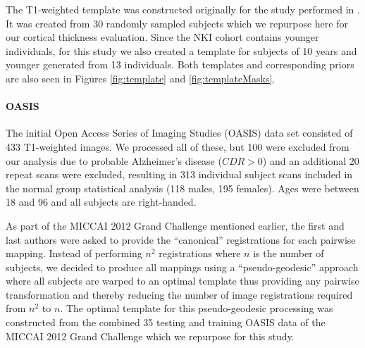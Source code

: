The T1-weighted template was constructed originally for the study performed
in \cite{tustison2013}.  It was created from 30 randomly sampled subjects 
which we repurpose here for our cortical thickness evaluation.  Since the 
NKI cohort contains younger individuals, for this study we also created a 
template for subjects of 10 years and younger generated from 13 individuals.
Both templates and corresponding priors are also seen in Figures \ref{fig:template} and \ref{fig:templateMasks}.

\paragraph{OASIS}
The initial Open Access Series of Imaging Studies (OASIS)
data set consisted of 433 T1-weighted images.  We processed all of these,
but 100 were excluded from our analysis due to probable Alzheimer's
disease ($CDR > 0$) and an additional 20 repeat scans were excluded,
 resulting in 313 individual subject scans included in the normal group statistical
analysis (118 males, 195 females).  Ages were between 18 and 96 and 
all subjects are right-handed.  

As part of the MICCAI 2012 Grand Challenge mentioned earlier, the first and
last authors were asked to provide the ``canonical'' registrations for each
pairwise mapping.  Instead of performing $n^2$ registrations where $n$ is
the number of subjects, we decided to produce all mappings using a 
``pseudo-geodesic'' approach where all subjects are warped to an optimal
template thus providing any pairwise transformation and thereby 
reducing the number of image registrations required from $n^2$ to $n$.
The optimal template for this pseudo-geodesic processing was constructed 
from the combined 35 testing and training OASIS data of the MICCAI 2012 Grand 
Challenge which we repurpose for this study.

